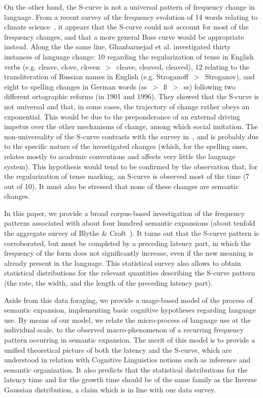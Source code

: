 \documentclass[12pt,twocolumn,amsmath,amssymb,aps,longbibliography]{revtex4-1}  %
\begin{document}
On the other hand, the S-curve is not a universal pattern of frequency change in language. From a recent survey of the frequency evolution of 14 words relating to climate science~\cite{bentley2012word}, it appears that the S-curve could not account for most of the frequency changes, and that a more general Bass curve would be appropriate instead. Along the the same line, Ghanbarnejad et al. \cite{ghanbarnejad2014extracting} investigated thirty instances of language change: 10 regarding the regularization of tense in English verbs (e.g. cleave, clove, cloven~$>$~cleave, cleaved, cleaved), 12 relating to the transliteration of Russian names in English (e.g. Stroganoff~$>$~Stroganov), and eight to spelling changes in German words (ss~$>$~{\ss}~$>$~ss) following two different ortographic reforms (in 1901 and 1996). They showed that the S-curve is not universal and that, in some cases, the trajectory of change rather obeys an exponential. This would be due to the preponderance of an external driving impetus over the other mechanisms of change, among which social imitation. The non-universality of the S-curve contrasts with the survey in~\cite{blythe2012s}, and is probably due to the specific nature of the investigated changes (which, for the spelling ones, relates mostly to academic conventions and affects very little the language system). This hypothesis would tend to be confirmed by the observation that, for the regularization of tense marking, an S-curve is observed most of the time (7 out of 10). It must also be stressed that none of these changes are semantic changes. 

In this paper, we provide a broad corpus-based investigation of the frequency patterns associated with about four hundred semantic expansions (about tenfold the aggregate survey of Blythe \& Croft~\cite{blythe2012s}). It turns out that the S-curve pattern is corroborated, but must be completed by a preceding latency part, in which the frequency of the form does not significantly increase, even if the new meaning is already present in the language. This statistical survey also allows to obtain statistical distributions for the relevant quantities describing the S-curve pattern (the rate, the width, and the length of the preceding latency part). 

Aside from this data foraging, we provide a usage-based model of the process of semantic expansion, implementing basic cognitive hypotheses regarding language use. By means of our model, we relate the micro-process of language use at the individual scale, to the observed macro-phenomenon of a recurring frequency pattern occurring in semantic expansion. The merit of this model is to provide a unified theoretical picture of both the latency and the S-curve, which are understood in relation with Cognitive Linguistics notions such as inference and semantic organization. It also predicts that the statistical distributions for the latency time and for the growth time should be of the same family as the Inverse Gaussian distribution, a claim which is in line with our data survey. 
\end{document}

